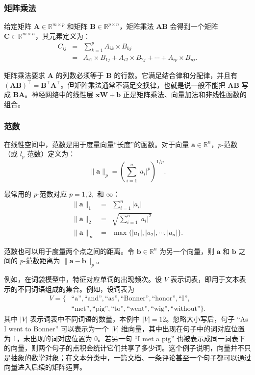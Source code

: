 \subsubsection{矩阵乘法}

\noindent 给定矩阵 $\mathbf{A} \in \mathbb{R}^{m \times p}$ 和矩阵 $\mathbf{B} \in \mathbb{R}^{p \times n}$，矩阵乘法 $\mathbf{A}\mathbf{B}$ 会得到一个矩阵 $\mathbf{C} \in \mathbb{R}^{m \times n}$，其元素定义为：
\begin{eqnarray}
C_{ij} & = & \sum_{k=1}^{p} A_{ik} \times B_{kj} \nonumber \\
       & = & A_{i1} \times B_{1j} + A_{i2} \times B_{2j}+ \cdots + A_{ip} \times B_{pj}.
\end{eqnarray}

矩阵乘法要求 $\mathbf{A}$ 的列数必须等于 $\mathbf{B}$ 的行数。它满足结合律和分配律，并且有 $(\mathbf{A}\mathbf{B})^\top=\mathbf{B}^\top\mathbf{A}^\top$。但矩阵乘法通常不满足交换律，也就是说一般不能把 $\mathbf{A}\mathbf{B}$ 写成 $\mathbf{B}\mathbf{A}$。神经网络中的线性层 $\mathbf{x}\mathbf{W}+\mathbf{b}$ 正是矩阵乘法、向量加法和非线性函数的组合。

\subsubsection{范数}
\label{sec:norm}

\noindent 在线性空间中，范数是用于度量向量“长度”的函数。对于向量 $\mathbf{a} \in \mathbb{R}^n$，$p$-范数（或 $l_p$ 范数）定义为：
\begin{equation}
\|\mathbf{a}\|_p = \left( \sum_{i=1}^{n} |a_i|^p \right)^{1/p}.
\end{equation}

最常用的 $p$-范数对应 $p=1, 2,$ 和 $\infty$：
\begin{eqnarray}
\|\mathbf{a}\|_1 & = & \sum_{i=1}^{n} |a_i| \\
\|\mathbf{a}\|_2 & = & \sqrt{\sum_{i=1}^{n} |a_i|^2} \\
\|\mathbf{a}\|_{\infty} & = & \max\{|a_1|,|a_2|,\cdots,|a_n|\}.
\end{eqnarray}

范数也可以用于度量两个点之间的距离。令 $\mathbf{b} \in \mathbb{R}^n$ 为另一个向量，则 $\mathbf{a}$ 和 $\mathbf{b}$ 之间的 $p$-范数距离为 $\|\mathbf{a} - \mathbf{b}\|_p$。

例如，在词袋模型中，特征对应单词的出现频次。设 $V$ 表示词表，即用于文本表示的不同词语组成的集合。例如，设词表为
\[
\begin{aligned}
V=\{&\text{``a''},\text{``and''},\text{``as''},\text{``Bonner''},
\text{``honor''},\text{``I''},\\
&\text{``met''},\text{``pig''},\text{``to''},\text{``went''},
\text{``wig''},\text{``without''}\}.
\end{aligned}
\]
其中 $|V|$ 表示词表中不同词语的数量，本例中 $|V|=12$。忽略大小写后，句子 ``As I went to Bonner'' 可以表示为一个 $|V|$ 维向量，其中出现在句子中的词对应位置为 1，未出现的词对应位置为 0。若另一句 ``I met a pig'' 也被表示成同一词表下的向量，则两个句子的点积会统计它们共享了多少词。这个例子说明，向量并不只是抽象的数学对象；在文本分类中，一篇文档、一条评论甚至一个句子都可以通过向量进入后续的矩阵运算。

